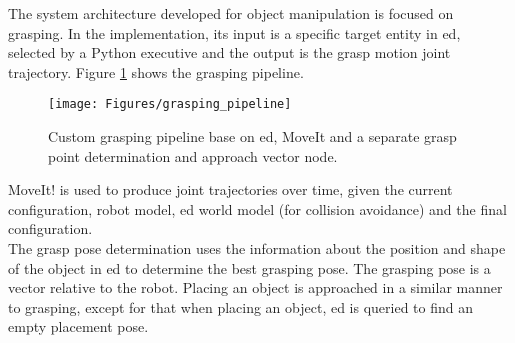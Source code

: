 The system architecture developed for object manipulation is focused on grasping. In the implementation, its input is a specific target entity in \acrshort{ed}, selected by a Python executive and the output is the grasp motion joint trajectory.
Figure \ref{fig:grasping_pipeline} shows the grasping pipeline.
\begin{figure}[H]
    \centering
	\texttt{[image: Figures/grasping\_pipeline]}
	\caption{Custom grasping pipeline base on \acrshort{ed}, MoveIt and a separate grasp point determination and approach vector node.}
	\label{fig:grasping_pipeline}
\end{figure}
\noindent MoveIt! is used to produce joint trajectories over time, given the current configuration, robot model, \acrshort{ed} world model (for collision avoidance) and the final configuration.
\\
\noindent The grasp pose determination uses the information about the position and shape of the object in \acrshort{ed} to determine the best grasping pose.
The grasping pose is a vector relative to the robot.
Placing an object is approached in a similar manner to grasping, except for that when placing an object, \acrshort{ed} is queried to find an empty placement pose.

%
